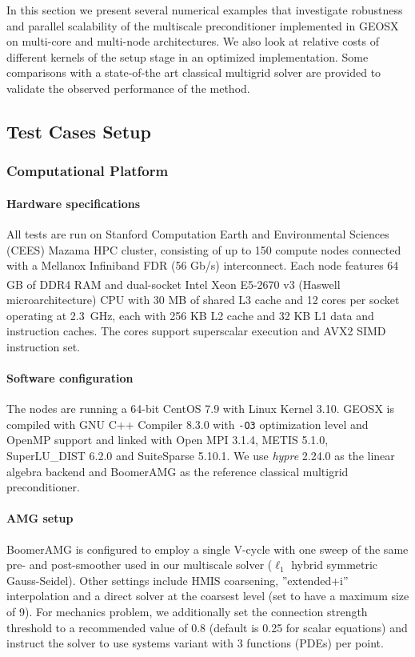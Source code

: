 In this section we present several numerical examples that investigate robustness and parallel scalability of the multiscale preconditioner implemented in GEOSX on multi-core and multi-node architectures.   We also look at relative costs of different kernels of the setup stage in an optimized implementation.   Some comparisons with a state-of-the art classical multigrid solver are provided to validate the observed performance of the method.

\subsection{Test Cases Setup}

\subsubsection{Computational Platform}

\paragraph{Hardware specifications} All tests are run on Stanford Computation Earth and Environmental Sciences (CEES) Mazama HPC cluster, consisting of up to 150 compute nodes connected with a Mellanox Infiniband FDR (56 Gb/s) interconnect.   Each node features 64 GB of DDR4 RAM and dual-socket Intel\textsuperscript{\tiny\textregistered} Xeon\textsuperscript{\tiny\textregistered} E5-2670 v3 (Haswell microarchitecture) CPU with 30 MB of shared L3 cache and 12 cores per socket operating at \qty{2.3}{\GHz}, each with 256 KB L2 cache and 32 KB L1 data and instruction caches.   The cores support superscalar execution and AVX2 SIMD instruction set.

\paragraph{Software configuration}
The nodes are running a 64-bit CentOS 7.9 with Linux Kernel 3.10.   GEOSX is compiled with GNU C++ Compiler 8.3.0 with \texttt{-O3} optimization level and OpenMP support and linked with Open MPI 3.1.4, METIS 5.1.0, SuperLU\_DIST 6.2.0 and SuiteSparse 5.10.1.   We use \textit{hypre} 2.24.0 \cite{hypre} as the linear algebra backend and BoomerAMG \cite{Henson2002} as the reference classical multigrid preconditioner.    

\paragraph{AMG setup}
BoomerAMG is configured to employ a single V-cycle with one sweep of the same pre- and post-smoother used in our multiscale solver ($\ell_1$ hybrid symmetric Gauss-Seidel).   Other settings include HMIS coarsening, ''extended+i'' interpolation and a direct solver at the coarsest level (set to have a maximum size of 9).   For mechanics problem, we additionally set the connection strength threshold to a recommended value of 0.8 (default is 0.25 for scalar equations) and instruct the solver to use systems variant with 3 functions (PDEs) per point.

